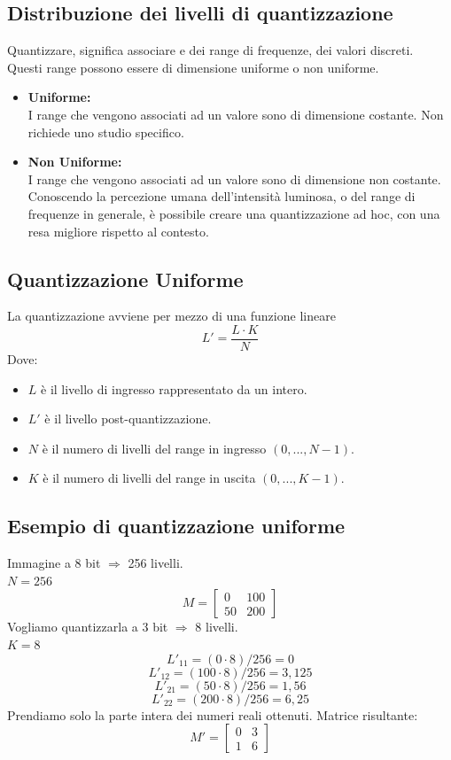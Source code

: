 \documentclass{report}
\begin{document}
	\subsection{Distribuzione dei livelli di quantizzazione}
	Quantizzare, significa associare e dei range di frequenze, dei valori discreti.\\
	Questi range possono essere di dimensione uniforme o non uniforme.
	\begin{itemize}
		\item \textbf{Uniforme:}\\
		      I range che vengono associati ad un valore sono di dimensione costante. Non richiede uno studio specifico.
		\item \textbf{Non Uniforme:}\\
		      I range che vengono associati ad un valore sono di dimensione non costante. Conoscendo la percezione umana dell'intensità luminosa, o del range di frequenze in generale, è possibile creare una quantizzazione ad hoc, con una resa migliore rispetto al contesto.
	\end{itemize}
	
	\subsection{Quantizzazione Uniforme}
	La quantizzazione avviene per mezzo di una funzione lineare
	$$
	L' = \frac{L \cdot K}{N}
	$$
	Dove:
	\begin{itemize}
		\item $L$ è il livello di ingresso rappresentato da un intero.
		\item $L'$ è il livello post-quantizzazione.
		\item $N$ è il numero di livelli del range in ingresso $(0, ..., N-1)$.
		\item $K$ è il numero di livelli del range in uscita $(0, ..., K-1)$.
	\end{itemize}
	\subsection{Esempio di quantizzazione uniforme}
	Immagine a 8 bit $\Rightarrow$ 256 livelli.\\
	$N = 256$
	$$
	M = 
	\begin{bmatrix}
		0  & 100 \\
		50 & 200 
	\end{bmatrix}
	$$
	Vogliamo quantizzarla a 3 bit $\Rightarrow$ 8 livelli.\\
	$K = 8$
	$$
	L'_{11} = (0 \cdot 8)/256 = 0
	$$
	$$
	L'_{12} = (100 \cdot 8)/256 = 3,125
	$$
	$$
	L'_{21} = (50 \cdot 8)/256 = 1,56
	$$
	$$
	L'_{22} = (200 \cdot 8)/256 = 6,25
	$$
	Prendiamo solo la parte intera dei numeri reali ottenuti. Matrice risultante:
	$$
	M' = 
	\begin{bmatrix}
		0 & 3 \\
		1 & 6 
	\end{bmatrix}
	$$
	
\end{document}
